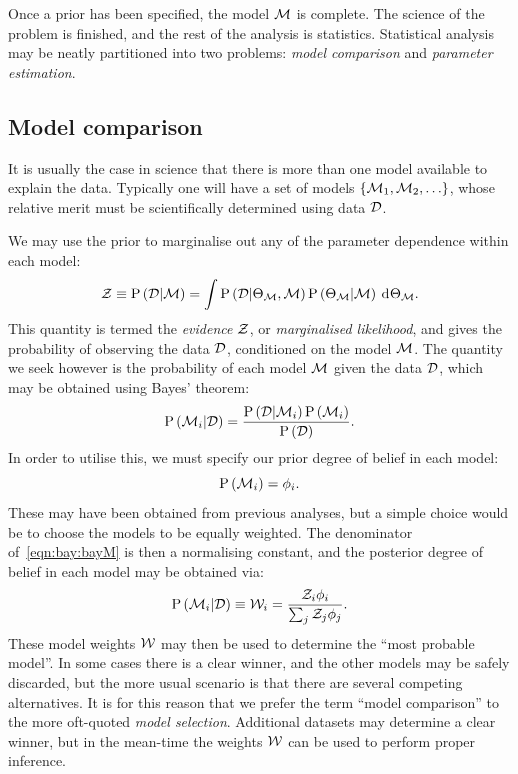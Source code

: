 Once a prior has been specified, the model \(\mathcal{M}\) is complete. The science of the problem is finished, and the rest of the analysis is statistics. Statistical analysis may be neatly partitioned into two problems: {\em model comparison\/} and {\em parameter estimation}.

\subsection{Model comparison}
It is usually the case in science that there is more than one model available to explain the data. Typically one will have a set of models \({\{\mathcal{M}_1,\mathcal{M}_2,\ldots\}}\), whose relative merit must be scientifically determined using data \(\mathcal{D}\).

We may use the prior to marginalise out any of the parameter dependence within each model:
\begin{equation}
  \mathcal{Z}\equiv\mathrm{P}\left(\mathcal{D}\middle|\mathcal{M}\right) 
  =
  \int  \mathrm{P}\left(\mathcal{D}\middle|\Theta_{\mathcal{M}},\mathcal{M}\right)\mathrm{P}\left(\Theta_{\mathcal{M}}\middle|\mathcal{M}\right)\:\operatorname{d}^{}\!{\Theta_{\mathcal{M}}}.
  \label{eqn:bay:ev_def}
\end{equation}
This quantity is termed the {\em evidence\/} \(\mathcal{Z}\), or {\em marginalised likelihood}, and gives the probability of observing the data \(\mathcal{D}\), conditioned on the model \(\mathcal{M}\). The quantity we seek however is the probability of each model \(\mathcal{M}\) given the data \(\mathcal{D}\), which may be obtained using Bayes' theorem:
\begin{equation}
  \mathrm{P}\left(\mathcal{M}_i\middle|\mathcal{D}\right) = \frac{\mathrm{P}\left(\mathcal{D}\middle|\mathcal{M}_i\right)\mathrm{P}\left(\mathcal{M}_i\right)}{\mathrm{P}\left(\mathcal{D}\right)}.
  \label{eqn:bay:bayM}
\end{equation}
In order to utilise this, we must specify our prior degree of belief in each model:
\begin{equation}
  \mathrm{P}\left(\mathcal{M}_i\right) = \phi_i.
\end{equation}
These may have been obtained from previous analyses, but a simple choice would be to choose the models to be equally weighted. The denominator of~\eqref{eqn:bay:bayM} is then a normalising constant, and the posterior degree of belief in each model may be obtained via:
\begin{equation}
  \mathrm{P}\left(\mathcal{M}_i\middle|\mathcal{D}\right) 
  \equiv
  \mathcal{W}_i
  =
  \frac{\mathcal{Z}_i\phi_i}{\sum_j \mathcal{Z}_j\phi_j}.
  \label{eqn:bay:model_weights}
\end{equation}
These model weights \(\mathcal{W}\) may then be used to determine the ``most probable model''. In some cases there is a clear winner, and the other models may be safely discarded, but the more usual scenario is that there are several competing alternatives. It is for this reason that we prefer the term ``model comparison'' to the more oft-quoted {\em model selection}. Additional datasets may determine a clear winner, but in the mean-time the weights \(\mathcal{W}\) can be used to perform proper inference. 


